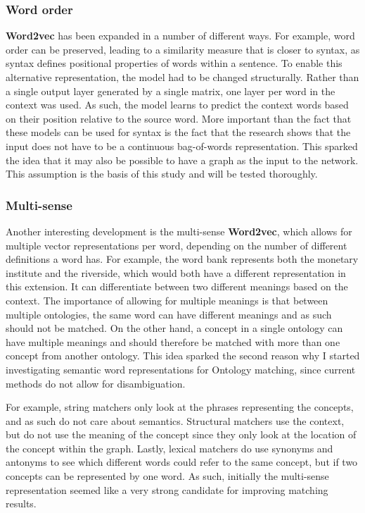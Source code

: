 \documentclass{article}
\begin{document}
 \subsubsection{Word order}
 \textbf{Word2vec} has been expanded in a number of different ways. For example, word order can be preserved, leading to a similarity measure that is closer to syntax, as syntax defines positional properties of words within a sentence\cite{ling2015}. To enable this alternative representation, the model had to be changed structurally. Rather than a single output layer generated by a single matrix, one layer per word in the context was used. As such, the model learns to predict the context words based on their position relative to the source word. More important than the fact that these models can be used for syntax is the fact that the research shows that the input does not have to be a continuous bag-of-words representation. This sparked the idea that it may also be possible to have a graph as the input to the network. This assumption is the basis of this study and will be tested thoroughly.
 
 \subsubsection{Multi-sense}
 Another interesting development is the multi-sense \textbf{Word2vec}, which allows for multiple vector representations per word, depending on the number of different definitions a word has. For example, the word bank represents both the monetary institute and the riverside, which would both have a different representation in this extension. It can differentiate between two different meanings based on the context. The importance of allowing for multiple meanings is that between multiple ontologies, the same word can have different meanings and as such should not be matched. On the other hand, a concept in a single ontology can have multiple meanings and should therefore be matched with more than one concept from another ontology\cite{multisense}. This idea sparked the second reason why I started investigating semantic word representations for Ontology matching, since current methods do not allow for disambiguation.
 
 For example, string matchers only look at the phrases representing the concepts, and as such do not care about semantics. Structural matchers use the context, but do not use the meaning of the concept since they only look at the location of the concept within the graph. Lastly, lexical matchers do use synonyms and antonyms to see which different words could refer to the same concept, but if two concepts can be represented by one word. As such, initially the multi-sense representation seemed like a very strong candidate for improving matching results.
 
\end{document}
